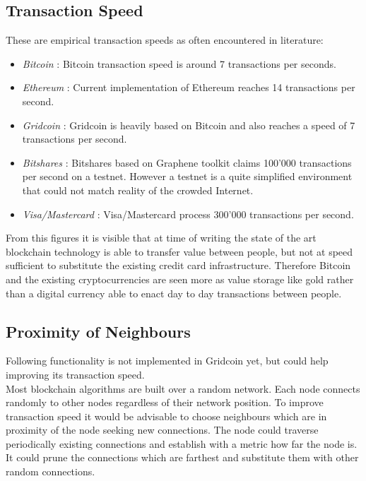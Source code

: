 \subsection{Transaction Speed}

These are empirical transaction speeds as often encountered in literature:

\begin{itemize}
  \item {\em Bitcoin } : Bitcoin transaction speed is around 7 transactions per seconds.
  \item {\em Ethereum } : Current implementation of Ethereum reaches 14 transactions per second.
  \item {\em Gridcoin } : Gridcoin is heavily based on Bitcoin and also reaches a speed of 7 transactions per second.
  \item {\em Bitshares } : Bitshares based on Graphene toolkit claims 100'000 transactions per second on a testnet. However a testnet is a quite simplified environment that could not match reality of the crowded Internet.
  \item {\em Visa/Mastercard } : Visa/Mastercard process 300'000 transactions per second.
\end{itemize}

From this figures it is visible that at time of writing the state of the art blockchain technology is able to transfer value between people, but not at speed sufficient to substitute the existing credit card infrastructure. Therefore Bitcoin and the existing cryptocurrencies are seen more as value storage like gold rather than a digital currency able to enact day to day transactions between people.\\


\subsection{Proximity of Neighbours}

Following functionality is not implemented in Gridcoin yet, but could help improving its transaction speed.\\

Most blockchain algorithms are built over a random network. Each node connects randomly to other nodes regardless of their network position. To improve transaction speed it would be advisable to choose neighbours which are in proximity of the node seeking new connections.  The node could traverse periodically existing connections and establish with a metric how far the node is. It could prune the connections which are farthest and substitute them with other random connections.

